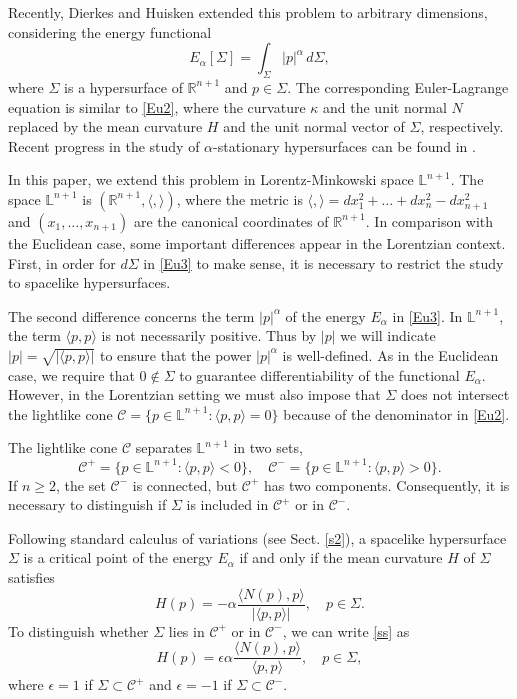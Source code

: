 \documentclass[a4paper,12pt]{amsart}
\theoremstyle{definition}
\def\r{\mathbb R}
\def\l{\mathbb L}
\begin{document}
Recently, Dierkes and Huisken extended this problem to arbitrary dimensions, considering the energy functional
\begin{equation}\label{Eu3}
E_\alpha[\Sigma]=\int_\Sigma |p|^\alpha\, d\Sigma,
\end{equation}
where $\Sigma$ is a hypersurface of $\r^{n+1}$ \cite{dh} and $p\in \Sigma$. The corresponding Euler-Lagrange equation is similar to \eqref{Eu2}, where the curvature $\kappa$ and the unit normal $N$ replaced by the mean curvature $H$ and the unit normal vector of $\Sigma$, respectively. Recent progress in the study of $\alpha$-stationary hypersurfaces can be found in   \cite{di,dl1,dl2,lo2}.

 
In this paper, we extend this problem in Lorentz-Minkowski space $\l^{n+1}$.  The space $\l^{n+1}$ is $(\r^{n+1},\langle,\rangle)$, where  the metric is $\langle,\rangle=dx_1^2+\ldots+dx_n^2-dx_{n+1}^2$ and $(x_1,\ldots,x_{n+1})$ are the canonical coordinates of $\r^{n+1}$. In comparison with the Euclidean case, some important differences appear in the Lorentzian context. First, in order for $d\Sigma$ in \eqref{Eu3} to make sense, it is necessary to restrict the study to spacelike hypersurfaces. 

The second difference concerns the term $|p|^\alpha$ of the energy $E_\alpha$ in \eqref{Eu3}. In $\l^{n+1}$, the term $\langle p,p\rangle$ is not necessarily positive. Thus by $|p|$ we will indicate $|p|=\sqrt{|\langle p,p\rangle|}$ to ensure that the  power $|p|^\alpha$ is well-defined. As in the Euclidean case, we require that $0\not\in \Sigma$ to guarantee differentiability of the functional $E_\alpha$. However, in the Lorentzian setting we must also impose that $\Sigma$ does not intersect the lightlike cone $\mathcal{C}=\{p\in\l^{n+1}\colon \langle p,p\rangle=0\}$ because of the denominator in \eqref{Eu2}. 

The lightlike cone $\mathcal{C}$ separates $\l^{n+1}$ in two sets, 
$$\mathcal{C}^+=\{p\in\l^{n+1}\colon \langle p,p\rangle <0\},\quad \mathcal{C}^-=\{p\in\l^{n+1}\colon \langle p,p\rangle >0\}.$$
If $n\geq 2$, the set $\mathcal{C}^-$ is connected, but $\mathcal{C}^+$ has two components.   Consequently,  it is necessary  to distinguish if $\Sigma$ is included in $\mathcal{C}^+$ or in $\mathcal{C}^-$. 


Following standard calculus of variations (see Sect. \ref{s2}), a spacelike hypersurface $\Sigma$ is a critical point of the energy $E_\alpha$ if and only if the mean curvature $H$ of $\Sigma$ satisfies
\begin{equation}\label{ss}
H(p)= -\alpha \frac{ \langle N(p),p\rangle}{|\langle p,p\rangle|}, \quad p \in \Sigma.
\end{equation}
To distinguish whether $\Sigma$ lies in $\mathcal{C}^+$  or in $ \mathcal{C}^-$, we can write \eqref{ss} as 
\begin{equation}\label{eq00}
H(p)= \epsilon\alpha \frac{ \langle N(p),p\rangle}{\langle p,p\rangle}, \quad   p \in \Sigma,
\end{equation}
where $\epsilon = 1$ if $\Sigma \subset \mathcal{C}^+$ and $\epsilon = -1$ if $\Sigma \subset \mathcal{C}^-$.
\end{document}
